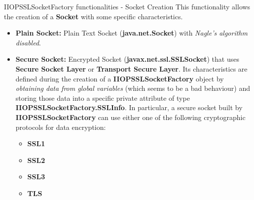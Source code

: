 \documentclass{../common/latex_classes/pdf_presentation}
\begin{document}
	\begin{frame}{IIOPSSLSocketFactory functionalities - Socket Creation}
		This functionality allows the creation of a \textbf{Socket} with some specific characteristics.
		\begin{itemize}
			\item \textbf{Plain Socket:}
				Plain Text Socket (\textbf{java.net.Socket}) with \textit{Nagle's algorithm disabled}.
			\item \textbf{Secure Socket:}
				Encrypted Socket (\textbf{javax.net.ssl.SSLSocket}) that uses \textbf{Secure Socket Layer} or \textbf{Transport Secure Layer}.
				Its characteristics are defined during the creation of a \textbf{IIOPSSLSocketFactory} object by \textit{obtaining data from global variables} (which seems to be a bad behaviour) and storing those data into a specific private attribute of type \textbf{IIOPSSLSocketFactory.SSLInfo}.
				In particular, a secure socket built by \textbf{IIOPSSLSocketFactory} can use either one of the following cryptographic protocols for data encryption:
			\begin{itemize}
				\item \textbf{SSL1} 
				\item \textbf{SSL2}
				\item \textbf{SSL3}
				\item \textbf{TLS}
			\end{itemize}
		\end{itemize}
	\end{frame}
	
\end{document}
